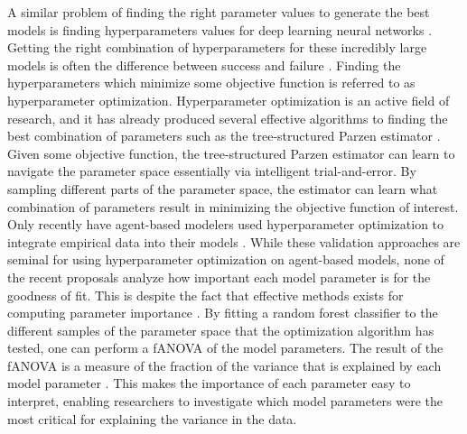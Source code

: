 \documentclass[11pt]{article}
\begin{document}
\noindent A similar problem of finding the right parameter values to generate the best models is finding hyperparameters values for deep learning neural networks \cite{bergstra_algorithms_2011}. Getting the right combination of hyperparameters for these incredibly large models is often the difference between success and failure \cite{akiba_optuna_2019,bergstra_algorithms_2011}. Finding the hyperparameters which minimize some objective function is referred to as hyperparameter optimization. Hyperparameter optimization is an active field of research, and it has already produced several effective algorithms to finding the best combination of parameters such as the tree-structured Parzen estimator \cite{akiba_optuna_2019, bergstra_algorithms_2011, hutter2014efficient}. Given some objective function, the tree-structured Parzen estimator can learn to navigate the parameter space essentially via intelligent trial-and-error. By sampling different parts of the parameter space, the estimator can learn what combination of parameters result in minimizing the objective function of interest. Only recently have agent-based modelers used hyperparameter optimization to integrate empirical data into their models \cite{kerr2021covasim, krivorotko2022agent}. While these validation approaches are seminal for using hyperparameter optimization on agent-based models, none of the recent proposals analyze how important each model parameter is for the goodness of fit. This is despite the fact that effective methods exists for computing parameter importance \cite{hutter2014efficient}. By fitting a random forest classifier to the different samples of the parameter space that the optimization algorithm has tested, one can perform a fANOVA of the model parameters. The result of the fANOVA is a measure of the fraction of the variance that is explained by each model parameter \cite{hutter2014efficient}. This makes the importance of each parameter easy to interpret, enabling researchers to investigate which model parameters were the most critical for explaining the variance in the data.  
\end{document}
